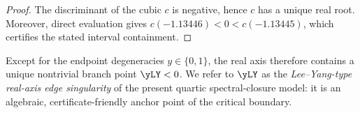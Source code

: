 \begin{proof}
The discriminant of the cubic \(c\) is negative, hence \(c\) has a unique real root.
Moreover, direct evaluation gives \(c(-1.13446)<0<c(-1.13445)\), which certifies the stated interval containment.
\end{proof}

Except for the endpoint degeneracies \(y\in\{0,1\}\), the real axis therefore contains a unique nontrivial branch point \(\yLY<0\).
We refer to \(\yLY\) as the \emph{Lee--Yang-type real-axis edge singularity} of the present quartic spectral-closure model: it is an algebraic, certificate-friendly anchor point of the critical boundary.

